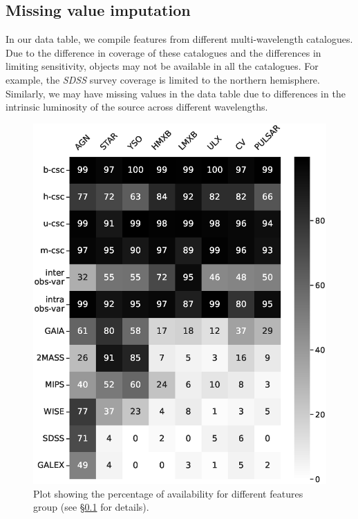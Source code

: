 \documentclass[fleqn,usenatbib]{mnras}
\begin{document}
  
    \subsection{Missing value imputation}\label{sec:missing-values}
    In our data table, we compile features from different multi-wavelength catalogues. Due to the difference in coverage of these catalogues and the differences in limiting sensitivity, objects may not be available in all the catalogues. For example, the {\em SDSS} survey coverage is limited to the northern hemisphere. Similarly, we may have missing values in the data table due to differences in the intrinsic luminosity of the source across different wavelengths.
     \begin{figure}
        \centering
        \includegraphics[width=\columnwidth]{images/missing_features_v2.eps}
        \caption{Plot showing the percentage of availability for different features group (see \S \ref{sec:missing-values} for details).}
        \label{fig:available-features}
    \end{figure}
\end{document}
